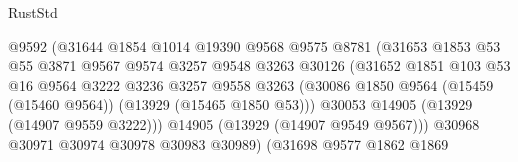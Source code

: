\begin{lexlean}{RustStd}
\begin{coremodule}
                                        @9592
                                        (@31644
                                          @1854
                                          @1014
                                          @19390
                                          @9568
                                          @9575
                                          @8781
                                          (@31653
                                            @1853
                                            @53
                                            @55
                                            @3871
                                            @9567
                                            @9574
                                            @3257
                                            @9548
                                            @3263
                                            @30126
                                            (@31652
                                              @1851
                                              @103
                                              @53
                                              @16
                                              @9564
                                              @3222
                                              @3236
                                              @3257
                                              @9558
                                              @3263
                                              (@30086
                                                @1850
                                                @9564
                                                (@15459 (@15460 @9564))
                                                (@13929 (@15465 @1850 @53)))
                                              @30053
                                              @14905
                                              (@13929 (@14907 @9559 @3222)))
                                            @14905
                                            (@13929 (@14907 @9549 @9567)))
                                          @30968
                                          @30971
                                          @30974
                                          @30978
                                          @30983
                                          @30989)
                                        (@31698
                                          @9577
                                          @1862
                                          @1869

\end{coremodule}
\end{lexlean}
